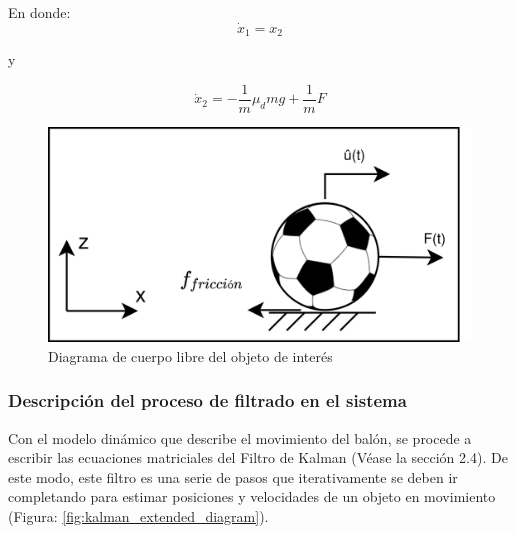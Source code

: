 En donde:
\begin{equation}
\dot{x}_1 = x_2
\label{eq:state_variable_1}
\end{equation}

y 

\begin{equation}
\dot{x}_2 = -\frac{1}{m}\mu_d m g + \frac{1}{m}F
\label{eq:state_variable_2}
\end{equation}


\begin{figure}
\centering
\includegraphics[scale=0.1]{images/dynamic_model.png}
\caption{Diagrama de cuerpo libre del objeto de interés}
\label{fig:dynamic_model}
\end{figure}

		\subsubsection*{Descripción del proceso de filtrado en el sistema}
Con el modelo dinámico que describe el movimiento del balón, se procede a escribir las ecuaciones matriciales del Filtro de Kalman (Véase la sección 2.4). De este modo, este filtro es una serie de pasos que iterativamente se deben ir completando para estimar posiciones y velocidades de un objeto en movimiento (Figura: \ref{fig:kalman_extended_diagram}).

